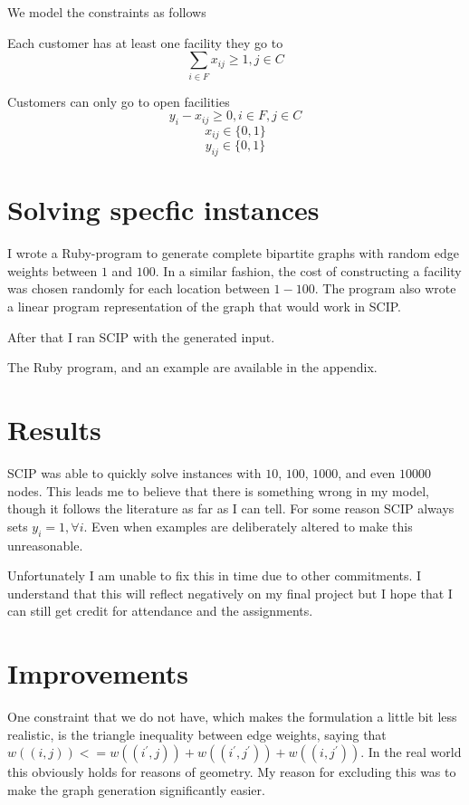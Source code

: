 \documentclass[12pt]{report}
\begin{document}
	We model the constraints as follows

		Each customer has at least one facility they go to
		$$ \sum_{i\in F} x_{ij} \ge 1, j\in C$$
		
		Customers can only go to open facilities
		$$ y_i - x_{ij} \ge 0, i\in F, j\in C$$
		$$ x_{ij} \in \{0,1\} $$
		$$ y_{ij} \in \{0,1\} $$


\section*{Solving specfic instances}
	I wrote a Ruby-program to generate complete bipartite graphs with random edge weights between $1$ and $100$. In a similar fashion, the cost of constructing a facility was chosen randomly for each location between $1-100$. The program also wrote a linear program representation of the graph that would work in SCIP.

	After that I ran SCIP with the generated input. 

	The Ruby program, and an example are available in the appendix.

\section*{Results}
	SCIP was able to quickly solve instances with $10$, $100$, $1000$, and even $10000$ nodes. This leads me to believe that there is something wrong in my model, though it follows the literature as far as I can tell. For some reason SCIP always sets $y_i = 1, \forall i$. Even when examples are deliberately altered to make this unreasonable.

	Unfortunately I am unable to fix this in time due to other commitments. I understand that this will reflect negatively on my final project but I hope that I can still get credit for attendance and the assignments.
 
\section*{Improvements}

	One constraint that we do not have, which makes the formulation a little bit less realistic, is the triangle inequality between edge weights, saying that $w((i,j)) <= w((i^\prime,j)) + w((i^\prime,j^\prime)) + w((i,j^\prime))$. In the real world this obviously holds for reasons of geometry. My reason for excluding this was to make the graph generation significantly easier.
\end{document}
